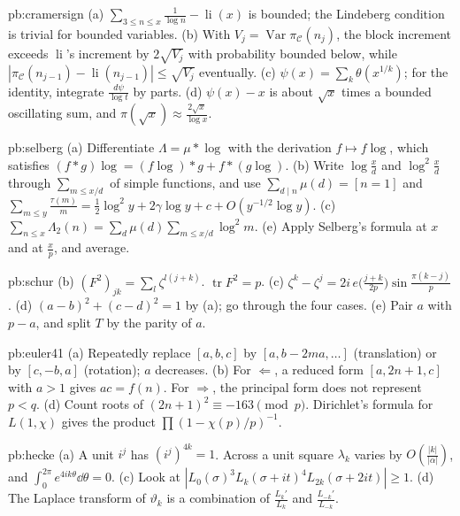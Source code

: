 \begin{hint}{pb:cramersign}
(a) $\sum_{3\le n\le x}\frac1{\log n}-\operatorname{li}(x)$ is bounded; the Lindeberg condition is trivial for bounded variables. (b) With $V_j=\operatorname{Var}\pi_{\mathcal C}(n_j)$, the
block increment exceeds $\operatorname{li}$'s increment by $2\sqrt{V_j}$ with probability bounded below, while $|\pi_{\mathcal C}(n_{j-1})-\operatorname{li}(n_{j-1})|\le\sqrt{V_j}$
eventually. (c) $\psi(x)=\sum_k\theta(x^{1/k})$; for the identity, integrate $\frac{d\psi}{\log t}$ by parts. (d) $\psi(x)-x$ is about $\sqrt x$ times a bounded
oscillating sum, and $\pi(\sqrt x)\approx\frac{2\sqrt x}{\log x}$.
\end{hint}

\begin{hint}{pb:selberg}
(a) Differentiate $\Lambda=\mu*\log$ with the derivation $f\mapsto f\log$, which satisfies $(f*g)\log=(f\log)*g+f*(g\log)$. (b) Write $\log\frac xd$ and $\log^2\frac xd$ through
$\sum_{m\le x/d}$ of simple functions, and use $\sum_{d\mid n}\mu(d)=[n=1]$ and $\sum_{m\le y}\frac{\tau(m)}m=\frac12\log^2y+2\gamma\log y+c+O(y^{-1/2}\log y)$. (c) $\sum_{n\le x}\Lambda_2(n)=\sum_d\mu(d)\sum_{m\le x/d}\log^2m$.
(e) Apply Selberg's formula at $x$ and at $\frac xp$, and average.
\end{hint}

\begin{hint}{pb:schur}
(b) $(F^2)_{jk}=\sum_l\zeta^{l(j+k)}$. $\operatorname{tr}F^2=p$. (c) $\zeta^k-\zeta^j=2i\,e\bigl(\frac{j+k}{2p}\bigr)\sin\frac{\pi(k-j)}p$. (d) $(a-b)^2+(c-d)^2=1$ by (a); go through the
four cases. (e) Pair $a$ with $p-a$, and split $T$ by the parity of $a$.
\end{hint}

\begin{hint}{pb:euler41}
(a) Repeatedly replace $[a,b,c]$ by $[a,b-2ma,\dots]$ (translation) or by $[c,-b,a]$ (rotation); $a$ decreases. (b) For $\Leftarrow$, a reduced form $[a,2n+1,c]$ with $a>1$ gives
$ac=f(n)$. For $\Rightarrow$, the principal form does not represent $p<q$. (d) Count roots of $(2n+1)^2\equiv-163\pmod p$. Dirichlet's formula for $L(1,\chi)$ gives the
product $\prod(1-\chi(p)/p)^{-1}$.
\end{hint}

\begin{hint}{pb:hecke}
(a) A unit $i^j$ has $(i^j)^{4k}=1$. Across a unit square $\lambda_k$ varies by $O(\frac{|k|}{|\alpha|})$, and $\int_0^{2\pi}e^{4ik\theta}\dd\theta=0$. (c) Look at
$|L_0(\sigma)^3L_k(\sigma+it)^4L_{2k}(\sigma+2it)|\ge1$. (d) The Laplace transform of $\vartheta_k$ is a combination of $\frac{L_k'}{L_k}$ and $\frac{L_{-k}'}{L_{-k}}$.
\end{hint}

